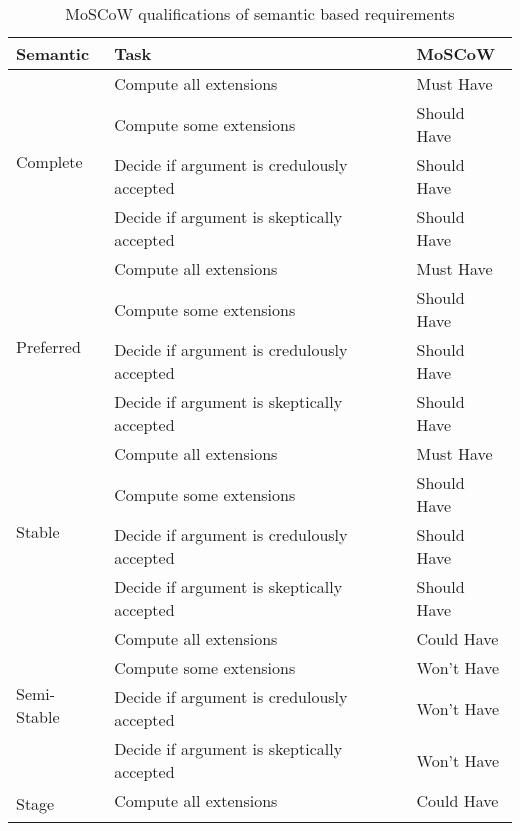 \begin{table}[]
	\centering
	\caption{MoSCoW qualifications of semantic based requirements}
	\label{table:moscowSemanticRequirements}
	\begin{tabular}{|l|l|l|}
		\hline
		\textbf{Semantic}            & \textbf{Task}                                   & \textbf{MoSCoW} \\ \hline \hline
		\multirow{4}{*}{Complete}    & Compute all extensions                           & Must Have       \\ \cline{2-3} 
		& Compute some extensions                          & Should Have     \\ \cline{2-3} 
		& Decide if argument is credulously accepted & Should Have     \\ \cline{2-3} 
		& Decide if argument is skeptically accepted & Should Have     \\ \hline
		\multirow{4}{*}{Preferred}   & Compute all extensions                           & Must Have       \\ \cline{2-3} 
		& Compute some extensions                          & Should Have     \\ \cline{2-3} 
		& Decide if argument is credulously accepted & Should Have     \\ \cline{2-3} 
		& Decide if argument is skeptically accepted & Should Have     \\ \hline
		\multirow{4}{*}{Stable}      & Compute all extensions                           & Must Have       \\ \cline{2-3} 
		& Compute some extensions                          & Should Have     \\ \cline{2-3} 
		& Decide if argument is credulously accepted & Should Have     \\ \cline{2-3} 
		& Decide if argument is skeptically accepted & Should Have     \\ \hline
		\multirow{4}{*}{Semi-Stable} & Compute all extensions                           & Could Have      \\ \cline{2-3} 
		& Compute some extensions                          & Won't Have      \\ \cline{2-3} 
		& Decide if argument is credulously accepted & Won't Have      \\ \cline{2-3} 
		& Decide if argument is skeptically accepted & Won't Have      \\ \hline
		\multirow{4}{*}{Stage}       & Compute all extensions                           & Could Have      \\ \cline{2-3} 

\end{tabular}
\end{table}
